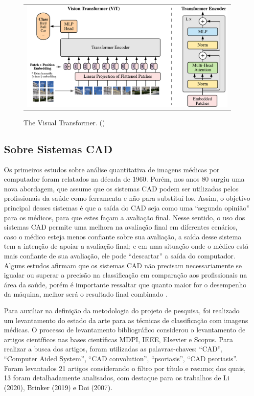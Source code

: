 \begin{figure}[h]
  \centering
    \begin{tabular}{c}
      \includegraphics[scale=0.4]{images/model_scheme.pdf}
    \end{tabular}
    \caption{The Visual Transformer. ()}
    \label{fig:vit-arch}
\end{figure}

\subsection{Sobre Sistemas CAD}

Os primeiros estudos sobre análise quantitativa de imagens médicas por computador foram relatados na década de 1960. Porém, nos anos 80 surgiu uma nova abordagem, que assume que os sistemas CAD podem ser utilizados pelos profissionais da saúde como ferramenta e não para substituí-los. Assim, o objetivo principal desses sistemas é que a saída do CAD seja como uma “segunda opinião” para os médicos, para que estes façam a avaliação final. Nesse sentido, o uso dos sistemas CAD permite uma melhora na avaliação final em diferentes cenários, caso o médico esteja menos confiante sobre sua avaliação, a saída desse sistema tem a intenção de apoiar a avaliação final; e em uma situação onde o médico está mais confiante de sua avaliação, ele pode “descartar” a saída do computador. Alguns estudos afirmam que os sistemas CAD não precisam necessariamente se igualar ou superar a precisão na classificação em comparação aos profissionais na área da saúde, porém é importante ressaltar que quanto maior for o desempenho da máquina, melhor será o resultado final combinado \cite{DOI2007198}.

Para auxiliar na definição da metodologia do projeto de pesquisa, foi realizado um levantamento do estado da arte para as técnicas de classificação com imagens médicas. O processo de levantamento bibliográfico considerou o levantamento de artigos científicos nas bases científicas MDPI, IEEE, Elsevier e Scopus. Para realizar a busca dos artigos, foram utilizadas as palavras-chaves: “CAD”, “Computer Aided System”, “CAD convolution”, “psoriasis”, “CAD psoriasis”. Foram levantados 21 artigos considerando o filtro por título e resumo; dos quais, 13 foram detalhadamente analisados, com destaque para os trabalhos de Li (2020), Brinker (2019) e Doi (2007).

